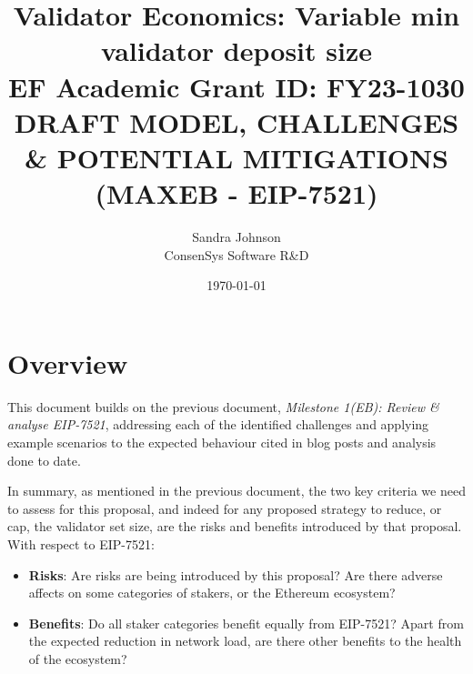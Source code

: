 \documentclass[UTF8]{article}
\title{Validator Economics: Variable min validator deposit size\\
\vspace{4pt}
\large EF Academic Grant ID: FY23-1030\\
\vspace{16pt}
DRAFT MODEL, CHALLENGES \& POTENTIAL MITIGATIONS\\
(MAXEB - EIP-7521) }
\author{Sandra Johnson\\
ConsenSys Software R\&D}
\date{\today}                                           %
\begin{document}
\maketitle



\section{Overview}
This document builds on the previous document, \textit{Milestone 1(EB): Review \& analyse EIP-7521}, addressing each of the identified challenges and applying example scenarios to the expected behaviour cited in blog posts and analysis done to date.

In summary, as mentioned in the previous document, the two key criteria we need to assess for this proposal, and indeed for any proposed strategy to reduce, or cap, the validator set size, are the risks and benefits introduced by that proposal. \\

\noindent
With respect to EIP-7521:
\begin{itemize}
\item \textbf{Risks}: Are risks are being introduced by this proposal? Are there adverse affects on some categories of stakers, or the Ethereum ecosystem?
\item  \textbf{Benefits}: Do all staker categories benefit equally from EIP-7521? Apart from the expected reduction in network load, are there other benefits to the health of the ecosystem?
\end{itemize}
\end{document}
